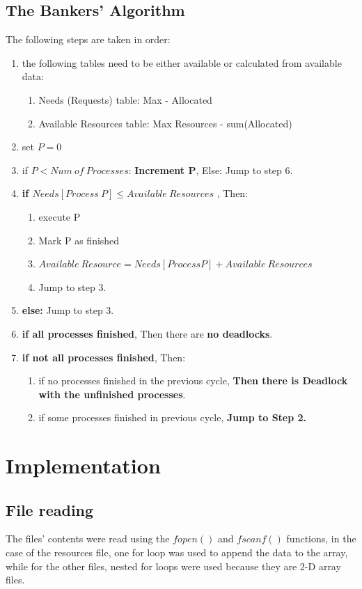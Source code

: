 \documentclass[pdftex,12pt,a4paper]{article}
\begin{document}
\subsection{The Bankers' Algorithm} \label{algorithm}
The following steps are taken in order:
\begin{enumerate}
    \item the following tables need to be either available or calculated from available data: 
    \begin{enumerate}
        \item Needs (Requests) table: Max - Allocated
        \item Available Resources table: Max Resources - sum(Allocated)
    \end{enumerate}
    \item set $P = 0$
    \item if $P < Num\ of\ Processes$: \textbf{Increment P}, Else: Jump to step 6.
    \item \textbf{if $Needs[Process\ P] \leq Available\ Resources$ }, Then:
    \begin{enumerate}
        \item execute P
        \item Mark P as finished
        \item $Available\ Resource = Needs[Process P] + Available\ Resources$
        \item Jump to step 3.
    \end{enumerate}
    \item  \textbf{else:} Jump to step 3.
    \item \textbf{if all processes finished}, Then there are \textbf{no deadlocks}.
    \item \textbf{if not all processes finished}, Then:
    \begin{enumerate}
        \item if no processes finished in the previous cycle, \textbf{Then there is Deadlock with the unfinished processes}.
        \item if some processes finished in previous cycle, \textbf{Jump to Step 2.}
    \end{enumerate}
\end{enumerate}

\section{Implementation}
\subsection{File reading}
The files' contents were read using the $fopen()$ and $fscanf()$ functions, in the case of the resources file, one for loop was used to append the data to the array, while for the other files, nested for loops were used because they are 2-D array files.
\end{document}
